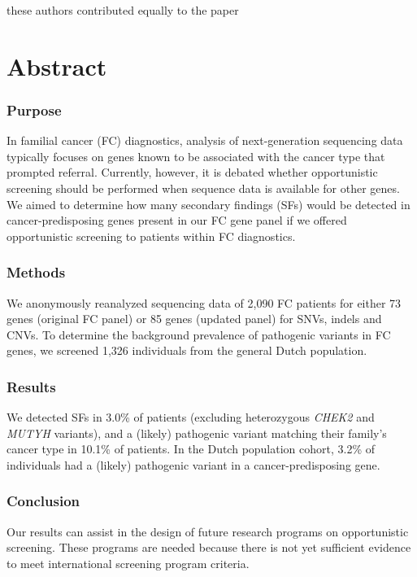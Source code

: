 \noindent* these authors contributed equally to the paper


\section*{Abstract}\label{abstract}
\subsubsection{Purpose}
In familial cancer (FC) diagnostics, analysis of next-generation sequencing data typically focuses on genes known to be associated with the cancer type that prompted referral. Currently, however, it is debated whether opportunistic screening should be performed when sequence data is available for other genes. We aimed to determine how many secondary findings (SFs) would be detected in cancer-predisposing genes present in our FC gene panel if we offered opportunistic screening to patients within FC diagnostics.
\subsubsection{Methods}
We anonymously reanalyzed sequencing data of 2,090 FC patients for either 73 genes (original FC panel) or 85 genes (updated panel) for SNVs, indels and CNVs. To determine the background prevalence of pathogenic variants in FC genes, we screened 1,326 individuals from the general Dutch population.
\subsubsection{Results}
We detected SFs in 3.0\% of patients (excluding heterozygous \textsl{CHEK2} and \textsl{MUTYH} variants), and a (likely) pathogenic variant matching their family’s cancer type in 10.1\% of patients. In the Dutch population cohort, 3.2\% of individuals had a (likely) pathogenic variant in a cancer-predisposing gene. 
\subsubsection{Conclusion}
Our results can assist in the design of future research programs on opportunistic screening. These programs are needed because there is not yet sufficient evidence to meet international screening program criteria. 

